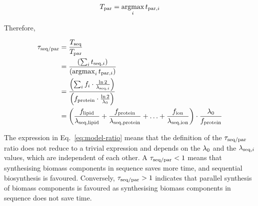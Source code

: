 
\begin{equation}
  T_{\mathrm{par}} = \operatorname*{argmax}_{i} t_{\mathrm{par},i}
  \label{eq:model-b}
\end{equation}


Therefore,

\begin{equation}
  \begin{aligned}
    \tau_{\mathrm{seq}/\mathrm{par}} &= \frac{T_{\mathrm{seq}}}{T_{\mathrm{par}}} \\
    & = \frac{\left( \sum_{i} t_{\mathrm{seq},i} \right)}{\left( \operatorname*{argmax}_{i} t_{\mathrm{par},i} \right)}\\
    & = \frac{\left(  \sum_{i} f_{i} \cdot \frac{\ln 2}{\lambda_{\mathrm{seq},i}} \right)}{\left( f_{\mathrm{protein}} \cdot \frac{\ln 2}{\lambda_{0}} \right)}\\
    & = \left( \frac{f_{\mathrm{lipid}}}{\lambda_{\mathrm{seq},\mathrm{lipid}}} + \frac{f_{\mathrm{protein}}}{\lambda_{\mathrm{seq},\mathrm{protein}}} + \ldots + \frac{f_{\mathrm{ion}}}{\lambda_{\mathrm{seq},\mathrm{ion}}} \right) \cdot \frac{\lambda_{0}}{f_{\mathrm{protein}}}
    \end{aligned}
  \label{eq:model-ratio}
\end{equation}

The expression in Eq.\ \ref{eq:model-ratio} means that the definition of the $\tau_{\mathrm{seq}/\mathrm{par}}$ ratio does not reduce to a trivial expression and depends on the $\lambda_{0}$ and the $\lambda_{\mathrm{seq},i}$ values, which are independent of each other.
A $\tau_{\mathrm{seq}/\mathrm{par}} < 1$ means that synthesising biomass components in sequence saves more time, and sequential biosynthesis is favoured.
Conversely, $\tau_{\mathrm{seq}/\mathrm{par}} > 1$ indicates that parallel synthesis of biomass components is favoured as synthesising biomass components in sequence does not save time.


